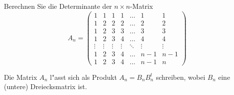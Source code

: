 Berechnen Sie die Determinante der $n\times n$-Matrix
\[
A_n
=
\begin{pmatrix}
     1&     1&     1&     1& \dots&     1&     1\\
     1&     2&     2&     2& \dots&     2&     2\\
     1&     2&     3&     3& \dots&     3&     3\\
     1&     2&     3&     4& \dots&     4&     4\\
\vdots&\vdots&\vdots&\vdots&\ddots&\vdots&\vdots\\
     1&     2&     3&     4& \dots&   n-1&   n-1\\
     1&     2&     3&     4& \dots&   n-1&     n
\end{pmatrix}
\]
\begin{hinweis}
Die Matrix $A_n$ l"asst sich als Produkt $A_n=B_nB_n^t$ schreiben, wobei 
$B_n$ eine (untere) Dreiecksmatrix ist.
\end{hinweis}

